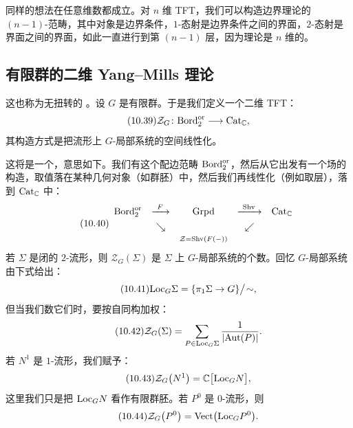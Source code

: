 同样的想法在任意维数都成立。对 $n$ 维 TFT，我们可以构造边界理论的 $(n-1)$-范畴，其中对象是边界条件，$1$-态射是边界条件之间的界面，$2$-态射是界面之间的界面，如此一直进行到第 $(n-1)$ 层，因为理论是 $n$ 维的。


\subsection{有限群的二维 Yang--Mills 理论}\label{sec:10-4-3}

这也称为无扭转的 。设 $G$ 是有限群。于是我们定义一个二维 TFT：
\begin{equation}\tag{10.39}
\mathcal{Z}_G\colon \mathrm{Bord}_2^{\mathrm{or}}\longrightarrow \mathrm{Cat}_{\mathbb{C}},
\end{equation}
其构造方式是把流形上 $G$-局部系统的空间线性化。

这将是一个，意思如下。我们有这个配边范畴 $\mathrm{Bord}_2^{\mathrm{or}}$，然后从它出发有一个场的构造，取值落在某种几何对象（如群胚）中，然后我们再线性化（例如取层），落到 $\mathrm{Cat}_{\mathbb{C}}$ 中：
\begin{equation}\tag{10.40}
\begin{array}{ccccc}
\mathrm{Bord}_2^{\mathrm{or}} & \xrightarrow{\ F\ } & \mathrm{Grpd} & \xrightarrow{\ \mathrm{Shv}\ } & \mathrm{Cat}_{\mathbb{C}}\\[4pt]
& \searrow & & \swarrow & \\
& & \scriptstyle \mathcal{Z}=\mathrm{Shv}(F(-)) & &
\end{array}
\end{equation}
若 $\Sigma$ 是闭的 $2$-流形，则 $\mathcal{Z}_G(\Sigma)$ 是 $\Sigma$ 上 $G$-局部系统的个数。回忆 $G$-局部系统由下式给出：
\begin{equation}\tag{10.41}
\mathrm{Loc}_G\Sigma=\{\pi_1\Sigma\to G\}\big/\!\sim,
\end{equation}
但当我们数它们时，要按自同构加权：
\begin{equation}\tag{10.42}
\mathcal{Z}_G(\Sigma)=\sum_{P\in\mathrm{Loc}_G\Sigma}\frac{1}{|\mathrm{Aut}(P)|}.
\end{equation}
若 $N^1$ 是 $1$-流形，我们赋予：
\begin{equation}\tag{10.43}
\mathcal{Z}_G\big(N^1\big)=\mathbb{C}\big[\mathrm{Loc}_G N\big],
\end{equation}
这里我们只是把 $\mathrm{Loc}_G N$ 看作有限群胚。若 $P^0$ 是 $0$-流形，则
\begin{equation}\tag{10.44}
\mathcal{Z}_G\big(P^0\big)=\mathrm{Vect}\big(\mathrm{Loc}_G P^0\big).
\end{equation}

